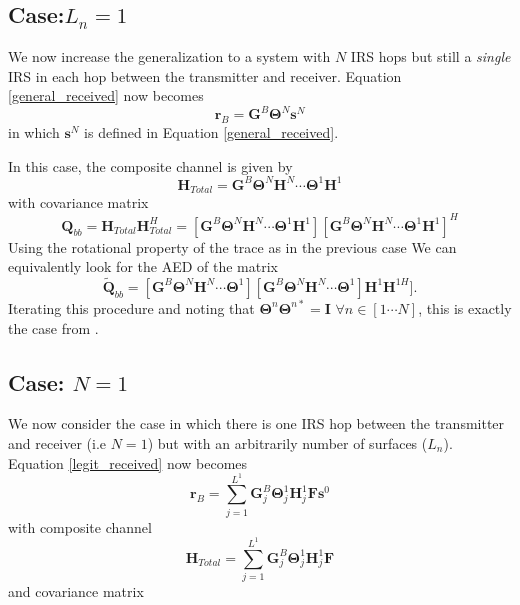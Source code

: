 \documentclass[12pt,a4paper]{report}
\begin{document}
\subsection{Case:$L_n=1$}
We now increase the generalization to a system with $N$ IRS hops but still a \emph{single} IRS in each hop between the transmitter and receiver. 
Equation \ref{general_received} now becomes 
\begin{equation}\label{}
\mathbf{r}_{B} =  \mathbf{G}^{B}\boldsymbol{\Theta}^{N}\mathbf{s}^{N}
\end{equation}
in which $\mathbf{s}^{N}$ is defined in Equation \ref{general_received}.

In this case, the composite channel is given by 
\begin{equation}
\mathbf{H}_{Total} = \mathbf{G}^{B}\boldsymbol{\Theta}^{N}\mathbf{H}^{N} \cdots \boldsymbol{\Theta}^{1}\mathbf{H}^{1}
\end{equation}
with covariance matrix 
\begin{equation}\label{polynomial_terms}
\mathbf{Q}_{bb} = \mathbf{H}_{Total}\mathbf{H}_{Total}^H = [\mathbf{G}^{B}\boldsymbol{\Theta}^{N}\mathbf{H}^{N} \cdots \boldsymbol{\Theta}^{1}\mathbf{H}^{1}][\mathbf{G}^{B}\boldsymbol{\Theta}^{N}\mathbf{H}^{N} \cdots \boldsymbol{\Theta}^{1}\mathbf{H}^{1}]^H
\end{equation}
Using the rotational property of the trace as in the previous case
We can equivalently look for the AED of the matrix 
\begin{equation}
\tilde{\mathbf{Q}}_{bb} = [\mathbf{G}^{B}\boldsymbol{\Theta}^{N}\mathbf{H}^{N} \cdots \boldsymbol{\Theta}^{1}][\mathbf{G}^{B}\boldsymbol{\Theta}^{N}\mathbf{H}^{N} \cdots \boldsymbol{\Theta}^{1}]\mathbf{H}^{1}\mathbf{H}^{1H}].
\end{equation}
Iterating this procedure and noting that $\boldsymbol{\Theta}^{n}\boldsymbol{\Theta}^{n*} = \mathbf{I}$ $\forall n \in [1\cdots N]$, this is exactly the case from \cite[Section 4.10]{muller2013applications}.

\subsection{Case: $N=1$}
We now consider the case in which there is one IRS hop between the transmitter and receiver (i.e $N=1$) but with an  arbitrarily number of surfaces ($L_n$). 
Equation \ref{legit_received} now becomes 
\begin{equation}
\mathbf{r}_{B} = \sum_{j = 1}^{L^{1}} \mathbf{G}^{B}_{j}\boldsymbol{\Theta}^{1}_{j}\mathbf{H}^{1}_{j}\mathbf{F}\mathbf{s}^0
\end{equation}
with composite channel
\begin{equation}
\mathbf{H}_{Total} = \sum_{j = 1}^{L^{1}} \mathbf{G}^{B}_{j}\boldsymbol{\Theta}^{1}_{j}\mathbf{H}^{1}_{j}\mathbf{F}
\end{equation}
and covariance matrix
\end{document}
